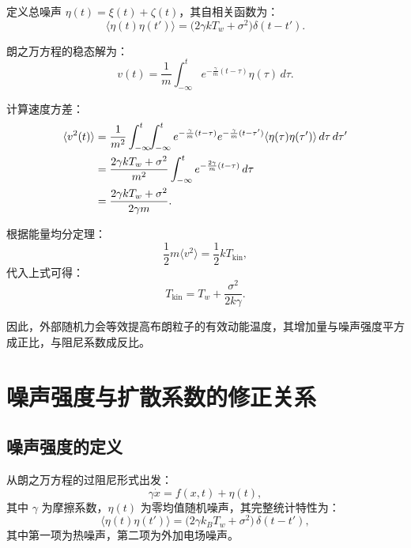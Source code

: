 \documentclass[a4paper,draft]{report}
\begin{document}
定义总噪声 $\eta(t) = \xi(t) + \zeta(t)$，其自相关函数为：
\begin{equation}
\langle \eta(t) \eta(t') \rangle = \big( 2\gamma k T_w + \sigma^2 \big) \delta(t - t').
\end{equation}

朗之万方程的稳态解为：
\begin{equation}
v(t) = \frac{1}{m} \int_{-\infty}^{t} e^{-\frac{\gamma}{m}(t-\tau)} \eta(\tau) \, d\tau.
\end{equation}

计算速度方差：
\begin{align}
\langle v^2(t) \rangle &= \frac{1}{m^2} \int_{-\infty}^{t} \!\! \int_{-\infty}^{t} 
e^{-\frac{\gamma}{m}(t-\tau)} e^{-\frac{\gamma}{m}(t-\tau')} 
\langle \eta(\tau) \eta(\tau') \rangle \, d\tau \, d\tau' \notag \\
&= \frac{2\gamma k T_w + \sigma^2}{m^2} \int_{-\infty}^{t} e^{-\frac{2\gamma}{m}(t-\tau)} \, d\tau \notag \\
&= \frac{2\gamma k T_w + \sigma^2}{2\gamma m}.
\end{align}

根据能量均分定理：
\begin{equation}
\frac{1}{2} m \langle v^2 \rangle = \frac{1}{2} k T_{\text{kin}},
\end{equation}
代入上式可得：
\begin{equation}
T_{\text{kin}} = T_w + \frac{\sigma^2}{2k\gamma}.
\end{equation}

因此，外部随机力会等效提高布朗粒子的有效动能温度，其增加量与噪声强度平方成正比，与阻尼系数成反比。

\section{噪声强度与扩散系数的修正关系}

\subsection{噪声强度的定义}
从朗之万方程的过阻尼形式出发：
\begin{equation}
\gamma \dot{x} = f(x,t) + \eta(t),
\end{equation}
其中 $\gamma$ 为摩擦系数，$\eta(t)$ 为零均值随机噪声，其完整统计特性为：
\begin{equation}
\langle \eta(t)\eta(t') \rangle = \big( 2\gamma k_B T_w + \sigma^2 \big) \, \delta(t-t'),
\end{equation}
其中第一项为热噪声，第二项为外加电场噪声。
\end{document}
